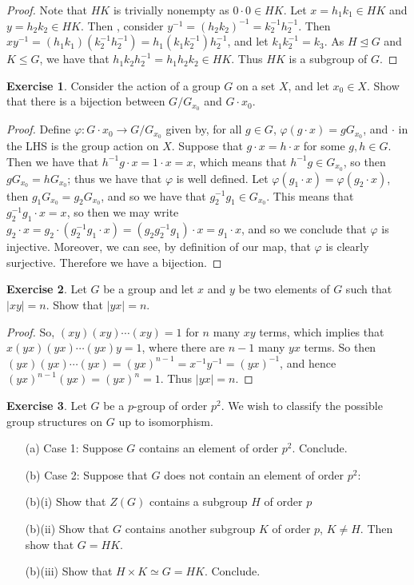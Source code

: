 \documentclass[9pt,reqno]{amsart}
\theoremstyle{definition}
\newtheorem{exercise}{Exercise}[section]
\begin{document}
\begin{proof}
	Note that $HK$ is trivially nonempty as $0 \cdot 0  \in HK$. Let $x = h_1 k_1 \in HK$ and $ y= h_2 k_2 \in HK$. Then , consider $y^{-1} = (h_2 k_2)^{-1} = k_2^{-1} h_2^{-1}$. Then $xy^{-1} = (h_1 k _1 )(k_2^{-1} h_2^{-1}) = h_1(k_1 k_2^{-1}) h_2^{-1}$, and let $k_1 k_2^{-1} = k_3$. As $H \trianglelefteq G$ and $K \leq G$, we have that $h_1 k_2 h_2^{-1}  = h_1 h_2 k_2 \in HK$. Thus $HK$ is a subgroup of $G$. 
\end{proof}
\begin{exercise}
Consider the action of a group $G$ on a set $X$, and let $x_0 \in X$. Show that there is a bijection between $G/ G_{x_0} $ and $G \cdot x_0$.	
\end{exercise}
\begin{proof}
	Define $\varphi \colon G \cdot x_0 \rightarrow G/G_{x_0}$ given by, for all $g \in G$, $\varphi(g \cdot x) = g G_{x_0} $, and $\cdot$ in the LHS is the group action on $X$. Suppose that $g \cdot x = h \cdot x$ for some $g, h \in G$. Then we have that $h^{-1} g \cdot x = 1 \cdot x =x$, which means that $h^{-1} g \in G_{x_0}$, so then $g G_{x_0} = h G_{x_0}$; thus we have that $\varphi $ is well defined. Let $\varphi (g_1  \cdot x) = \varphi (g_2 \cdot x)$, then $g_1 G_{x_0} = g_2 G_{x_0}$, and so we have that $g_2^{-1} g_1 \in G_{x_0}$. This means that $g_2^{-1} g_1 \cdot x = x $, so then we may write $g_2 \cdot x = g_2 \cdot (g_2^{-1} g_1 \cdot x)= (g_2 g_2^{-1} g_1)\cdot x = g_1 \cdot x$, and so we conclude that $\varphi$ is injective. Moreover, we can see, by definition of our map, that $\varphi $ is clearly surjective. Therefore we have a bijection. 
\end{proof}
\begin{exercise}
	Let $G$ be a group and let $x$ and $y$ be two elements of $G$ such that $|xy| = n$. Show that $|yx| = n$. 
\end{exercise}
\begin{proof}
	So, $(xy)(xy)\cdots (xy) = 1$ for $n$ many $xy$ terms, which implies that  $x(yx)(yx) \cdots (yx)y = 1$, where there are $n-1$ many $yx$ terms. So then $(yx)(yx)\cdots (yx) = (yx)^{n-1} =  x^{-1} y^{-1} = (yx)^{-1}$, and hence $(yx)^{n-1} (yx) = (yx)^n = 1$. Thus $|yx| = n$. \end{proof}
	\begin{exercise}Let $G$ be a $p$-group of order $p^2$. We wish to classify the possible group structures on $G$ up to isomorphism.
		\begin{itemize} 
		\item[(a)]Case 1: Suppose $G$ contains an element of order $p^2$. Conclude.
		\item[(b)] Case 2: Suppose that $G$ does not contain an element of order $p^2$: 
		\item[ (b)(i)] Show that $Z(G)$ contains a subgroup $H$ of order $p$
		\item [(b)(ii)] Show that $G$ contains another subgroup $K$ of order $p$, $K \neq H$. Then show that $G = HK$. 
		\item [(b)(iii)] Show that $H \times K \simeq G = HK$. Conclude.
		\end{itemize}
	\end{exercise}
\end{document}

